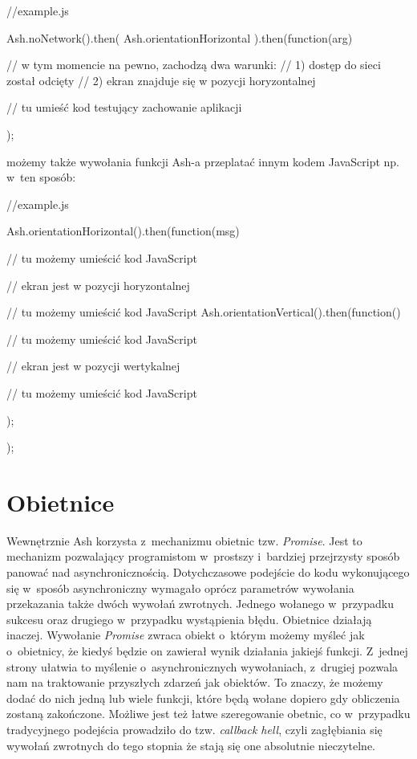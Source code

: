\documentclass[brudnopis]{xmgr}
\begin{document}
\begin{javascriptcode}
    //example.js

    Ash.noNetwork().then(
	    Ash.orientationHorizontal
    ).then(function(arg){
      	//  w tym momencie na pewno, zachodzą dwa warunki: 
      	//  1) dostęp do sieci został odcięty  
      	//  2) ekran znajduje się w pozycji horyzontalnej 

      	// tu umieść kod testujący zachowanie aplikacji  
    });
\end{javascriptcode}

możemy także wywołania funkcji Ash-a przeplatać innym kodem JavaScript np. w~ten sposób:

\begin{javascriptcode}
    //example.js

    Ash.orientationHorizontal().then(function(msg){
	//  tu możemy umieścić kod JavaScript 
      	
	// ekran jest w pozycji horyzontalnej
      
	//  tu możemy umieścić kod JavaScript 
      	Ash.orientationVertical().then(function(){
		//  tu możemy umieścić kod JavaScript 

		// ekran jest w pozycji wertykalnej 

		//  tu możemy umieścić kod JavaScript 
      	});
    });
\end{javascriptcode}

\section{Obietnice}\label{promise}

Wewnętrznie Ash korzysta z~mechanizmu obietnic tzw. \textit{Promise}. Jest to mechanizm pozwalający programistom w~prostszy i~bardziej przejrzysty sposób panować nad asynchronicznością. Dotychczasowe podejście do kodu wykonującego się w~sposób asynchroniczny wymagało oprócz parametrów wywołania przekazania także dwóch wywołań zwrotnych. Jednego wołanego w~przypadku sukcesu oraz drugiego w~przypadku wystąpienia błędu. Obietnice działają inaczej. Wywołanie \textit{Promise} zwraca obiekt o~którym możemy myśleć jak o~obietnicy, że kiedyś będzie on zawierał wynik działania jakiejś funkcji. Z~jednej strony ułatwia to myślenie o~asynchronicznych wywołaniach, z~drugiej pozwala nam na traktowanie przyszłych zdarzeń jak obiektów. To znaczy, że możemy dodać do nich jedną lub wiele funkcji, które będą wołane dopiero gdy obliczenia zostaną zakończone. Możliwe jest też łatwe szeregowanie obetnic, co w~przypadku tradycyjnego podejścia prowadziło do tzw. \textit{callback hell}, czyli zagłębiania się wywołań zwrotnych do tego stopnia że stają się one absolutnie nieczytelne. 
\end{document}
